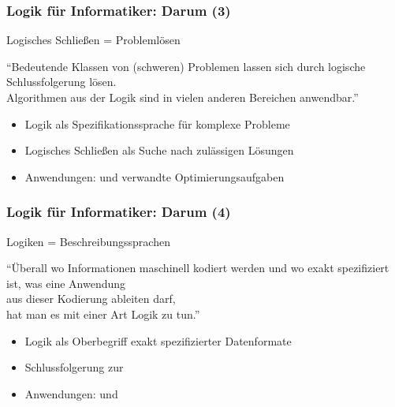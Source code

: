 \documentclass[onlymath]{beamer}
\begin{document}
\begin{frame}\frametitle{Logik für Informatiker: Darum (3)}

\begin{center}
\LARGE 
Logisches Schließen = Problemlösen

\bigskip
\large
"`Bedeutende Klassen von (schweren) Problemen lassen sich durch logische Schlussfolgerung lösen.\\
Algorithmen aus der Logik sind in vielen anderen Bereichen anwendbar."'
\end{center}


\begin{itemize}
\item Logik als Spezifikationssprache für komplexe Probleme
\item Logisches Schließen als Suche nach zulässigen Lösungen
\item Anwendungen:  und verwandte Optimierungsaufgaben
\end{itemize}

\end{frame}

\begin{frame}\frametitle{Logik für Informatiker: Darum (4)}

\begin{center}
\LARGE 
Logiken = Beschreibungssprachen

\bigskip
\large
"`Überall wo Informationen maschinell kodiert werden und wo exakt spezifiziert ist, was eine Anwendung\\ aus dieser Kodierung ableiten darf,\\hat man es mit einer Art Logik zu tun."'
\end{center}


\begin{itemize}
\item Logik als Oberbegriff exakt spezifizierter Datenformate
\item Schlussfolgerung zur 
\item Anwendungen:  und 
\end{itemize}
\end{frame}
\end{document}
